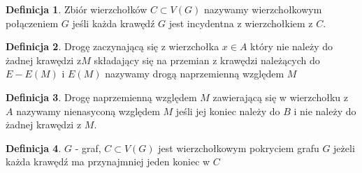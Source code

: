 \documentclass[12pt,a4paper]{article}
\theoremstyle{definition}
\newtheorem{df}{Definicja}
\begin{document}
\begin{df}
Zbiór wierzchołków $C\subset V(G)$ nazywamy wierzchołkowym połączeniem $G$ jeśli każda krawędź $G$ jest incydentna z wierzchołkiem z $C$.
\end{df}

\begin{df}
Drogę zaczynającą się z wierzchołka $x\in A$ który nie należy do żadnej krawędzi z$M$ składający się na przemian z krawędzi należących do $E-E(M)$ i $E(M)$ nazywamy drogą naprzemienną względem $M$
\end{df}

\begin{df}
Drogę naprzemienną względem $M$ zawierającą się w wierzchołku z $A$ nazywamy nienasyconą względem $M$ jeśli jej koniec należy do $B$ i nie należy do żadnej krawędzi z $M$.
\end{df}


\begin{df}
$G$ - graf, $C\subset V(G)$ jest wierzchołkowym pokryciem grafu $G$ jeżeli każda krawędź ma przynajmniej jeden koniec w $C$
\end{df}
\end{document}
